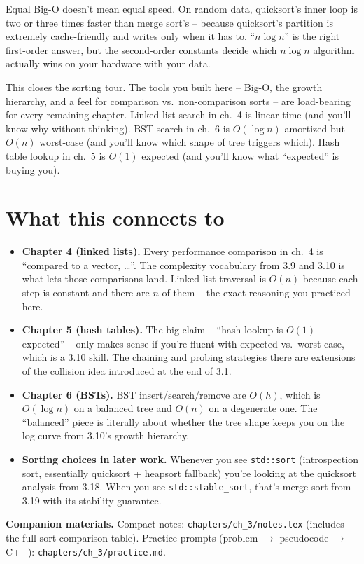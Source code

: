 \documentclass[11pt]{article}
\begin{document}
\begin{warnbox}
Equal Big-O doesn't mean equal speed. On random data, quicksort's
inner loop is two or three times faster than merge sort's --
because quicksort's partition is extremely cache-friendly and
writes only when it has to. ``$n \log n$'' is the right first-order
answer, but the second-order constants decide which $n \log n$
algorithm actually wins on your hardware with your data.
\end{warnbox}

\begin{ideabox}
This closes the sorting tour. The tools you built here -- Big-O, the
growth hierarchy, and a feel for comparison vs.\ non-comparison sorts --
are load-bearing for every remaining chapter. Linked-list search in
ch.~4 is linear time (and you'll know why without thinking). BST search
in ch.~6 is $O(\log n)$ amortized but $O(n)$ worst-case (and you'll know
which shape of tree triggers which). Hash table lookup in ch.~5 is $O(1)$
expected (and you'll know what ``expected'' is buying you).
\end{ideabox}

\section*{What this connects to}

\begin{notebox}
\begin{itemize}
    \item \textbf{Chapter 4 (linked lists).} Every performance comparison
    in ch.~4 is ``compared to a vector, \ldots''. The complexity
    vocabulary from 3.9 and 3.10 is what lets those comparisons land.
    Linked-list traversal is $O(n)$ because each step is constant and
    there are $n$ of them -- the exact reasoning you practiced here.
    \item \textbf{Chapter 5 (hash tables).} The big claim -- ``hash
    lookup is $O(1)$ expected'' -- only makes sense if you're fluent
    with expected vs.\ worst case, which is a 3.10 skill. The chaining
    and probing strategies there are extensions of the collision idea
    introduced at the end of 3.1.
    \item \textbf{Chapter 6 (BSTs).} BST insert/search/remove are
    $O(h)$, which is $O(\log n)$ on a balanced tree and $O(n)$ on a
    degenerate one. The ``balanced'' piece is literally about whether
    the tree shape keeps you on the log curve from 3.10's growth
    hierarchy.
    \item \textbf{Sorting choices in later work.} Whenever you see
    \texttt{std::sort} (introspection sort, essentially quicksort +
    heapsort fallback) you're looking at the quicksort analysis from
    3.18. When you see \texttt{std::stable\_sort}, that's merge sort
    from 3.19 with its stability guarantee.
\end{itemize}
\end{notebox}

\textbf{Companion materials.} Compact notes:
\texttt{chapters/ch\_3/notes.tex} (includes the full sort comparison
table). Practice prompts (problem $\to$ pseudocode $\to$ C++):
\texttt{chapters/ch\_3/practice.md}.
\end{document}
